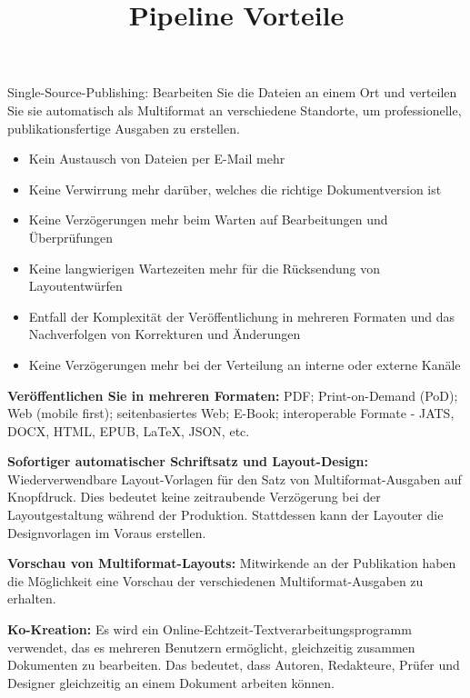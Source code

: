 \documentclass{article}
\begin{document}
\title{Pipeline Vorteile}

\maketitle


Single-Source-Publishing: Bearbeiten Sie die Dateien an einem Ort und verteilen Sie sie automatisch als Multiformat an verschiedene Standorte, um professionelle, publikationsfertige Ausgaben zu erstellen.

\begin{itemize}
\item Kein Austausch von Dateien per E-Mail mehr


\item Keine Verwirrung mehr darüber, welches die richtige Dokumentversion ist


\item Keine Verzögerungen mehr beim Warten auf Bearbeitungen und Überprüfungen


\item Keine langwierigen Wartezeiten mehr für die Rücksendung von Layoutentwürfen


\item Entfall der Komplexität der Veröffentlichung in mehreren Formaten und das Nachverfolgen von Korrekturen und Änderungen


\item Keine Verzögerungen mehr bei der Verteilung an interne oder externe Kanäle


\end{itemize}

\textbf{Veröffentlichen Sie in mehreren Formaten:} PDF; Print-on-Demand (PoD); Web (mobile first); seitenbasiertes Web; E-Book; interoperable Formate - JATS, DOCX, HTML, EPUB, LaTeX, JSON, etc.


\textbf{Sofortiger automatischer Schriftsatz und Layout-Design:} Wiederverwendbare Layout-Vorlagen für den Satz von Multiformat-Ausgaben auf Knopfdruck. Dies bedeutet keine zeitraubende Verzögerung bei der Layoutgestaltung während der Produktion. Stattdessen kann der Layouter die Designvorlagen im Voraus erstellen.


\textbf{Vorschau von Multiformat-Layouts:} Mitwirkende an der Publikation haben die Möglichkeit eine Vorschau der verschiedenen Multiformat-Ausgaben zu erhalten.


\textbf{Ko-Kreation:} Es wird ein Online-Echtzeit-Textverarbeitungsprogramm verwendet, das es mehreren Benutzern ermöglicht, gleichzeitig zusammen Dokumenten zu bearbeiten. Das bedeutet, dass Autoren, Redakteure, Prüfer und Designer gleichzeitig an einem Dokument arbeiten können.
\end{document}
